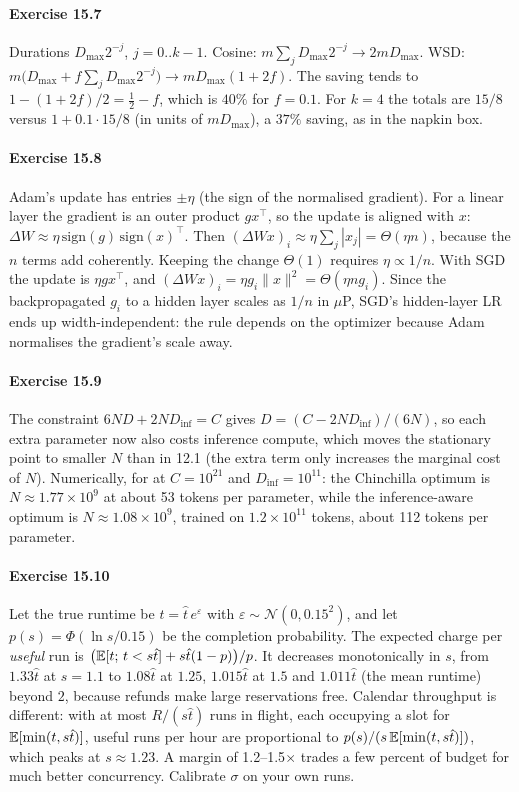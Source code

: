 \paragraph{Exercise 15.7} Durations $D_{\max}2^{-j}$, $j=0..k-1$. Cosine: $m\sum_j D_{\max}2^{-j}\to
2mD_{\max}$. WSD: $m\bigl(D_{\max}+f\sum_jD_{\max}2^{-j}\bigr)\to mD_{\max}(1+2f)$. The saving tends
to $1-(1+2f)/2=\tfrac12-f$, which is $40\%$ for $f=0.1$. For $k=4$ the totals are $15/8$ versus
$1+0.1\cdot15/8$ (in units of $mD_{\max}$), a $37\%$ saving, as in the napkin box.

\paragraph{Exercise 15.8} Adam's update has entries $\pm\eta$ (the sign of the normalised
gradient). For a linear layer the gradient is an outer product $g x^\top$, so the update is aligned
with $x$: $\Delta W\approx\eta\,\mathrm{sign}(g)\,\mathrm{sign}(x)^\top$. Then
$(\Delta W x)_i\approx\eta\sum_j|x_j|=\Theta(\eta n)$, because the $n$ terms add coherently. Keeping
the change $\Theta(1)$ requires $\eta\propto1/n$. With SGD the update is $\eta g x^\top$, and
$(\Delta Wx)_i=\eta g_i\|x\|^2=\Theta(\eta n g_i)$. Since the backpropagated $g_i$ to a hidden layer
scales as $1/n$ in $\mu$P, SGD's hidden-layer LR ends up width-independent: the rule depends on
the optimizer because Adam normalises the gradient's scale away.

\paragraph{Exercise 15.9} The constraint $6ND+2ND_{\text{inf}}=C$ gives
$D=(C-2ND_{\text{inf}})/(6N)$, so each extra parameter now also costs inference compute, which
moves the stationary point to smaller $N$ than in 12.1 (the extra term only increases the marginal
cost of $N$). Numerically, for  at $C=10^{21}$ and $D_{\text{inf}}=10^{11}$:
the Chinchilla optimum is $N\approx1.77\times10^9$ at about 53 tokens per parameter, while the
inference-aware optimum is $N\approx1.08\times10^9$, trained on $1.2\times10^{11}$ tokens, about
112 tokens per parameter.

\paragraph{Exercise 15.10} Let the true runtime be $t=\hat t\,e^{\varepsilon}$ with
$\varepsilon\sim\mathcal N(0,0.15^2)$, and let $p(s)=\Phi(\ln s/0.15)$ be the completion probability.
The expected charge per \emph{useful} run is
$\bigl(\mathbb{E}[t;\,t<s\hat t]+s\hat t(1-p)\bigr)/p$. It decreases monotonically in $s$, from
$1.33\hat t$ at $s=1.1$ to $1.08\hat t$ at $1.25$, $1.015\hat t$ at $1.5$ and $1.011\hat t$
(the mean runtime) beyond $2$, because refunds make large reservations free. Calendar throughput is
different: with at most $R/(s\hat t)$ runs in flight, each occupying a slot for $\mathbb{E}[\min(t,s\hat t)]$,
useful runs per hour are proportional to $p(s)/(s\,\mathbb{E}[\min(t,s\hat t)])$, which peaks at
$s\approx1.23$. A margin of 1.2--1.5$\times$ trades a few percent of budget for much better
concurrency. Calibrate $\sigma$ on your own runs.

